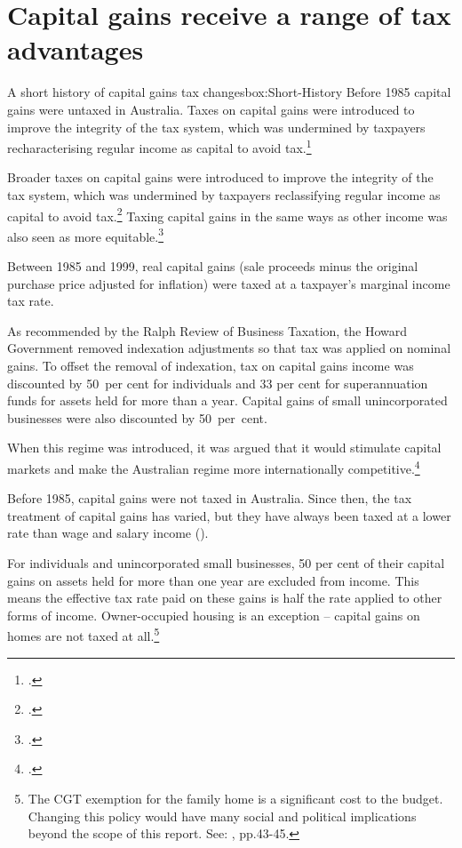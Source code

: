 \section{Capital gains receive a range of tax advantages}\label{sec:CG-receive-tax-advantages}
\begin{smallbox}[p]{A short history of capital gains tax changes}{box:Short-History}
Before 1985 capital gains were untaxed in Australia. Taxes on capital gains were introduced to improve the integrity of the tax system, which was undermined by taxpayers recharacterising regular income as capital to avoid tax.\footcite{ReinhardtSteel2006}

Broader taxes on capital gains were introduced to improve the integrity of the tax system, which was undermined by taxpayers reclassifying regular income as capital to avoid tax.\footcites{Evans2005}{Kenny2005} Taxing capital gains in the same ways as other income was also seen as more equitable.\footcite{AustralianGovernment1985}

Between 1985 and 1999, real capital gains (sale proceeds minus the original purchase price adjusted for inflation) were taxed at a taxpayer’s marginal income tax rate. 

As recommended by the Ralph Review of Business Taxation, the Howard Government removed indexation adjustments so that tax was applied on nominal gains. To offset the removal of indexation, tax on capital gains income was discounted by 50~per cent for individuals and 33 per cent for superannuation funds for assets held for more than a year. Capital gains of small unincorporated businesses were also discounted by 50~per~cent. 

When this regime was introduced, it was argued that it would stimulate capital markets and make the Australian regime more internationally competitive.\footcite[][14, 598]{RalphReview1999}
\end{smallbox}
Before 1985, capital gains were not taxed in Australia. Since then, the tax treatment of capital gains has varied, but they have always been taxed at a lower rate than wage and salary income (). 

For individuals and unincorporated small businesses, 50 per cent of their capital gains on assets held for more than one year are excluded from income. This means the effective tax rate paid on these gains is half the rate applied to other forms of income. Owner-occupied housing is an exception – capital gains on homes are not taxed at all.\footnote{The CGT exemption for the family home is a significant cost to the budget. Changing this policy would have many social and political implications beyond the scope of this report. See: \textcite{DaleyMcGannonSavageEtAl2013BalancingBudgets}, pp.43-45.}

